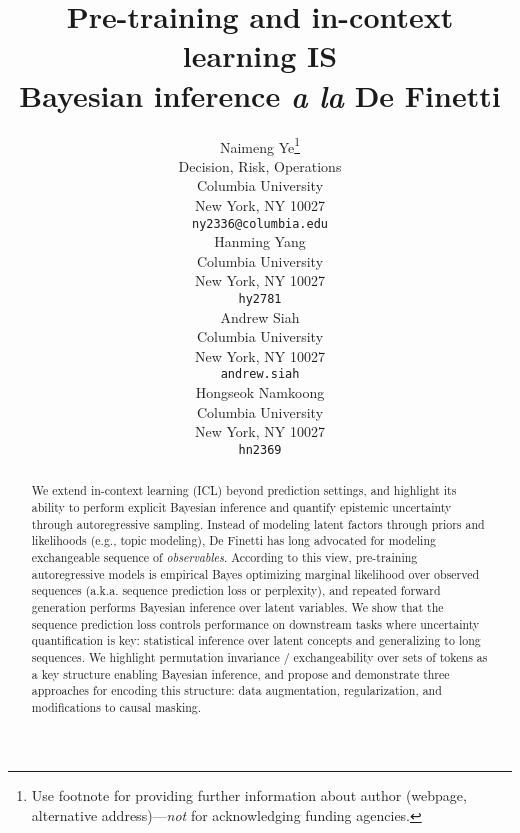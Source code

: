 \documentclass{article}
\title{\centering Pre-training and in-context learning IS \\ Bayesian inference \emph{a la} De Finetti}
\author{%
  Naimeng Ye\thanks{Use footnote for providing further information
    about author (webpage, alternative address)---\emph{not} for acknowledging
    funding agencies.} \\
  Decision, Risk, Operations\\
  Columbia University\\
  New York, NY 10027 \\
  \texttt{ny2336@columbia.edu} \\
  \And
  Hanming Yang \\
  Columbia University\\
  New York, NY 10027 \\
  \texttt{hy2781}\\
  \And
  Andrew Siah \\
  Columbia University\\
  New York, NY 10027 \\
  \texttt{andrew.siah}\\
  \And
  Hongseok Namkoong \\
  Columbia University\\
  New York, NY 10027 \\
  \texttt{hn2369}\\
}
\begin{document}
\maketitle


\begin{abstract}
  We extend in-context learning (ICL) beyond prediction settings, and
  highlight its ability to perform explicit Bayesian inference and quantify
  epistemic uncertainty through autoregressive sampling.  Instead of modeling
  latent factors through priors and likelihoods (e.g., topic modeling), De
  Finetti has long advocated for modeling exchangeable sequence of
  \emph{observables}. According to this view, pre-training autoregressive
  models is empirical Bayes optimizing marginal likelihood over observed
  sequences (a.k.a. sequence prediction loss or perplexity), and repeated
  forward generation performs Bayesian inference over latent variables. We
  show that the sequence prediction loss controls performance on downstream
  tasks where uncertainty quantification is key: statistical inference over
  latent concepts and generalizing to long sequences. We highlight permutation
  invariance / exchangeability over sets of tokens as a key structure enabling
  Bayesian inference, and propose and demonstrate three approaches for
  encoding this structure: data augmentation, regularization, and
  modifications to causal masking.
\end{abstract}







\begin{comment}
  In-context learning (ICL) has emerged as a powerful learning paradigm. Going
  back to De Finetti’s work on Bayesian inference using observables—as opposed
  to priors on latent factors/parameters—we establish an \emph{explicit}
  equivalence between ICL and Bayesian inference \emph{a la} De Finetti. From
  this view, pre-training is precisely empirical Bayes: it optimizes the
  marginal likelihood of observed sequences; compared to fitting priors in
  conventional empirical Bayes, pre-training fits posterior predictives using
  transformers. Our observation highlights previously under-explored
  capabilities of ICL: statistical inference and uncertainty
  quantification. Our theory highlights the importance of predictive coherence
  and motivates a new regularizer for pre-training sequence models to be
  logically coherent Bayesians statisticians. Our preliminary empirical
  results demonstrate coherency regularization can substantially improve the
  inferential capabilities of ICL.
\end{comment}
\end{document}
